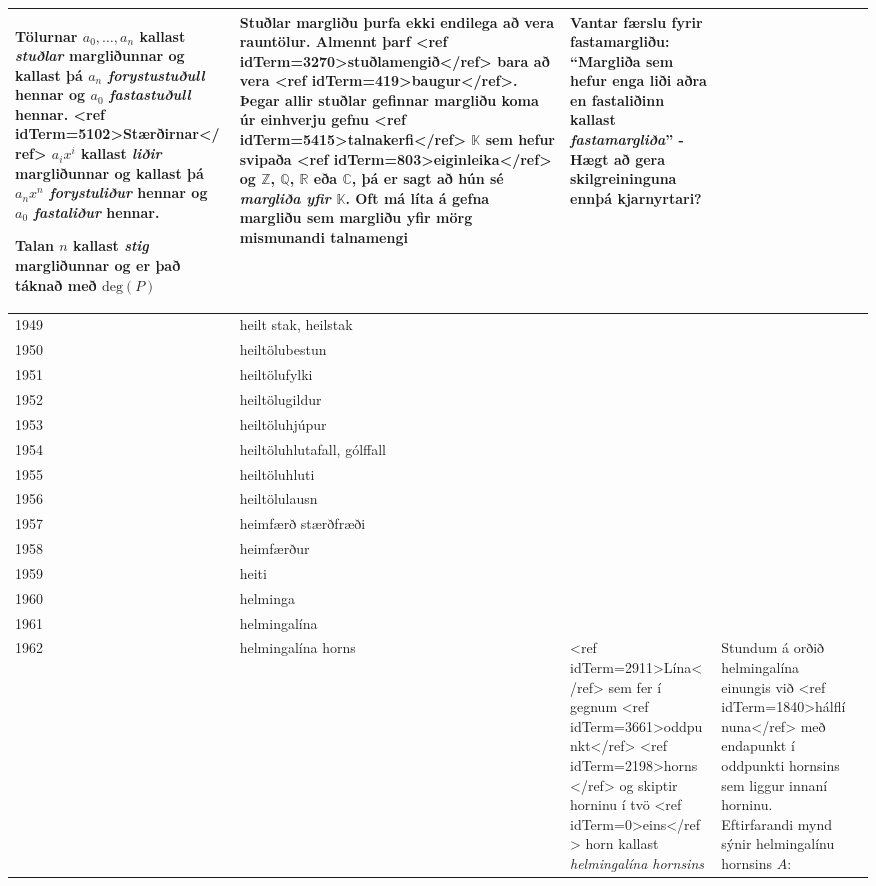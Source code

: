 \begin{longtable}{p{}|p{}|p{}|p{}|p{}}
Tölurnar $a_{0}, \ldots, a_{n}$ kallast \textit{stuðlar} margliðunnar og kallast þá $a_{n}$ \textit{forystustuðull} hennar og $a_{0}$ \textit{fastastuðull} hennar. <ref idTerm=5102>Stærðirnar</ref> $a_{i}x^i$ kallast \textit{liðir} margliðunnar og kallast þá $a_{n}x^n$ \textit{forystuliður} hennar og $a_{0}$ \textit{fastaliður} hennar.

Talan $n$ kallast \textit{stig} margliðunnar og er það táknað með $\text{deg}(P)$ & Stuðlar margliðu þurfa ekki endilega að vera rauntölur. Almennt þarf <ref idTerm=3270>stuðlamengið</ref> bara að vera <ref idTerm=419>baugur</ref>. Þegar allir stuðlar gefinnar margliðu koma úr einhverju gefnu <ref idTerm=5415>talnakerfi</ref> $\mathbb{K}$ sem hefur svipaða <ref idTerm=803>eiginleika</ref> og $\mathbb{Z}$, $\mathbb{Q}$, $\mathbb{R}$ eða $\mathbb{C}$, þá er sagt að hún sé \textit{margliða yfir $\mathbb{K}$}. Oft má líta á gefna margliðu sem margliðu yfir mörg mismunandi talnamengi & Vantar færslu fyrir fastamargliðu: ``Margliða sem hefur enga liði aðra en fastaliðinn kallast \textit{fastamargliða}'' - Hægt að gera skilgreininguna ennþá kjarnyrtari? \\
\hline
1949 & heilt stak, heilstak &  &  &  \\
\hline
1950 & heiltölubestun &  &  &  \\
\hline
1951 & heiltölufylki &  &  &  \\
\hline
1952 & heiltölugildur &  &  &  \\
\hline
1953 & heiltöluhjúpur &  &  &  \\
\hline
1954 & heiltöluhlutafall, gólffall &  &  &  \\
\hline
1955 & heiltöluhluti &  &  &  \\
\hline
1956 & heiltölulausn &  &  &  \\
\hline
1957 & heimfærð stærðfræði &  &  &  \\
\hline
1958 & heimfærður &  &  &  \\
\hline
1959 & heiti &  &  &  \\
\hline
1960 & helminga &  &  &  \\
\hline
1961 & helmingalína &  &  &  \\
\hline
1962 & helmingalína horns & <ref idTerm=2911>Lína</ref> sem fer í gegnum <ref idTerm=3661>oddpunkt</ref> <ref idTerm=2198>horns</ref> og skiptir horninu í tvö <ref idTerm=0>eins</ref> horn kallast \textit{helmingalína hornsins} & Stundum á orðið helmingalína einungis við <ref idTerm=1840>hálflínuna</ref> með endapunkt í oddpunkti hornsins sem liggur innaní horninu. Eftirfarandi mynd sýnir helmingalínu hornsins $A$:


\end{longtable}
